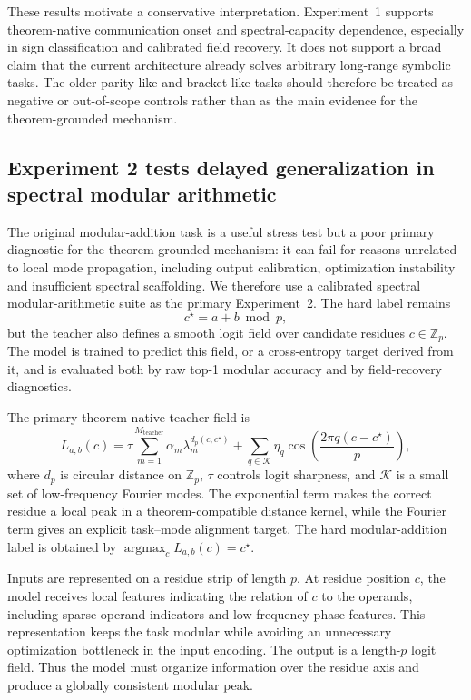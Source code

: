 \documentclass[11pt]{article}
\theoremstyle{definition}
\newcommand{\argmax}{\mathop{\mathrm{argmax}}}
\begin{document}
These results motivate a conservative interpretation. Experiment~1 supports theorem-native communication onset and spectral-capacity dependence, especially in sign classification and calibrated field recovery. It does not support a broad claim that the current architecture already solves arbitrary long-range symbolic tasks. The older parity-like and bracket-like tasks should therefore be treated as negative or out-of-scope controls rather than as the main evidence for the theorem-grounded mechanism.

\subsection*{Experiment 2 tests delayed generalization in spectral modular arithmetic}

The original modular-addition task is a useful stress test but a poor primary diagnostic for the theorem-grounded mechanism: it can fail for reasons unrelated to local mode propagation, including output calibration, optimization instability and insufficient spectral scaffolding. We therefore use a calibrated spectral modular-arithmetic suite as the primary Experiment~2. The hard label remains
\[
c^\star = a+b \bmod p ,
\]
but the teacher also defines a smooth logit field over candidate residues \(c\in\mathbb Z_p\). The model is trained to predict this field, or a cross-entropy target derived from it, and is evaluated both by raw top-1 modular accuracy and by field-recovery diagnostics.

The primary theorem-native teacher field is
\begin{equation}
L_{a,b}(c)
=
\tau
\sum_{m=1}^{M_{\mathrm{teacher}}}
\alpha_m
\lambda_m^{d_p(c,c^\star)}
+
\sum_{q\in\mathcal K}
\eta_q
\cos\!\left(\frac{2\pi q(c-c^\star)}{p}\right),
\label{eq:spectral-modular-field}
\end{equation}
where \(d_p\) is circular distance on \(\mathbb Z_p\), \(\tau\) controls logit sharpness, and \(\mathcal K\) is a small set of low-frequency Fourier modes. The exponential term makes the correct residue a local peak in a theorem-compatible distance kernel, while the Fourier term gives an explicit task--mode alignment target. The hard modular-addition label is obtained by \(\argmax_c L_{a,b}(c)=c^\star\).

Inputs are represented on a residue strip of length \(p\). At residue position \(c\), the model receives local features indicating the relation of \(c\) to the operands, including sparse operand indicators and low-frequency phase features. This representation keeps the task modular while avoiding an unnecessary optimization bottleneck in the input encoding. The output is a length-\(p\) logit field. Thus the model must organize information over the residue axis and produce a globally consistent modular peak.
\end{document}
